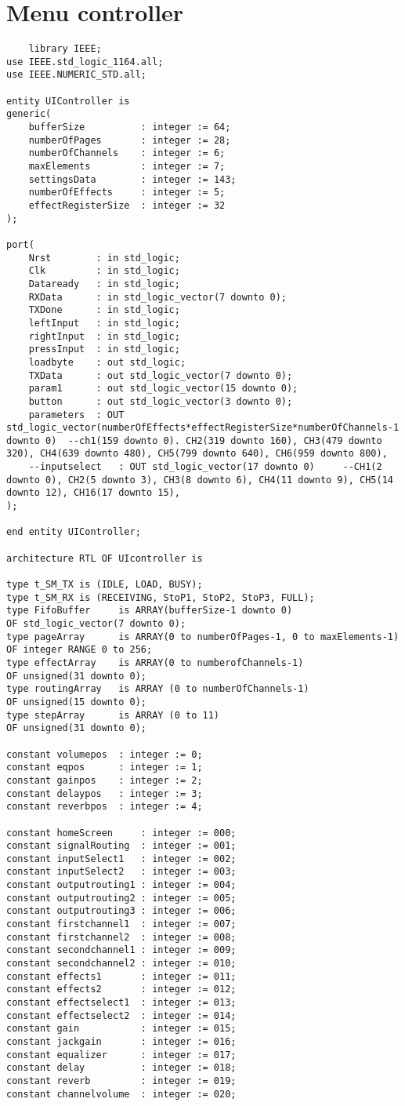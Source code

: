 \section*{Menu controller}
\begin{lstlisting}
    library IEEE;
use IEEE.std_logic_1164.all;
use IEEE.NUMERIC_STD.all;

entity UIController is
generic(
	bufferSize 			: integer := 64;
	numberOfPages 		: integer := 28;
	numberOfChannels	: integer := 6;
	maxElements			: integer := 7;
	settingsData		: integer := 143;
	numberOfEffects		: integer := 5;
	effectRegisterSize	: integer := 32
);

port(
	Nrst		: in std_logic;
	Clk			: in std_logic;
	Dataready	: in std_logic;
	RXData		: in std_logic_vector(7 downto 0);
	TXDone		: in std_logic;
	leftInput	: in std_logic;
	rightInput	: in std_logic;
	pressInput	: in std_logic;
	loadbyte	: out std_logic;
	TXData		: out std_logic_vector(7 downto 0);
	param1		: out std_logic_vector(15 downto 0);
	button		: out std_logic_vector(3 downto 0);
	parameters	: OUT std_logic_vector(numberOfEffects*effectRegisterSize*numberOfChannels-1 downto 0) 	--ch1(159 downto 0). CH2(319 downto 160), CH3(479 downto 320), CH4(639 downto 480), CH5(799 downto 640), CH6(959 downto 800),
	--inputselect	: OUT std_logic_vector(17 downto 0)		--CH1(2 downto 0), CH2(5 downto 3), CH3(8 downto 6), CH4(11 downto 9), CH5(14 downto 12), CH16(17 downto 15), 
);

end entity UIController;

architecture RTL OF UIcontroller is

type t_SM_TX is (IDLE, LOAD, BUSY);
type t_SM_RX is (RECEIVING, StoP1, StoP2, StoP3, FULL);
type FifoBuffer 	is ARRAY(bufferSize-1 downto 0) 					OF std_logic_vector(7 downto 0);
type pageArray 		is ARRAY(0 to numberOfPages-1, 0 to maxElements-1)	OF integer RANGE 0 to 256;
type effectArray 	is ARRAY(0 to numberofChannels-1)					OF unsigned(31 downto 0);
type routingArray	is ARRAY (0 to numberOfChannels-1)					OF unsigned(15 downto 0);
type stepArray		is ARRAY (0 to 11)									OF unsigned(31 downto 0);

constant volumepos 	: integer := 0;
constant eqpos		: integer := 1;
constant gainpos	: integer := 2;
constant delaypos	: integer := 3;
constant reverbpos	: integer := 4;

constant homeScreen		: integer := 000;
constant signalRouting	: integer := 001;
constant inputSelect1	: integer := 002;
constant inputSelect2	: integer := 003;
constant outputrouting1	: integer := 004;
constant outputrouting2	: integer := 005;
constant outputrouting3	: integer := 006;
constant firstchannel1	: integer := 007;
constant firstchannel2	: integer := 008;
constant secondchannel1	: integer := 009;
constant secondchannel2 : integer := 010;
constant effects1		: integer := 011;
constant effects2		: integer := 012;
constant effectselect1	: integer := 013;
constant effectselect2	: integer := 014;
constant gain			: integer := 015;
constant jackgain		: integer := 016;
constant equalizer		: integer := 017;
constant delay			: integer := 018;
constant reverb			: integer := 019;
constant channelvolume	: integer := 020;


\end{lstlisting}
